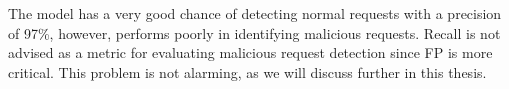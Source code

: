 The model has a very good chance of detecting normal requests with a precision of 97\%, however, performs poorly in identifying malicious requests. Recall is not advised as a metric for evaluating malicious request detection since FP is more critical. This problem is not alarming, as we will discuss further in this thesis.




